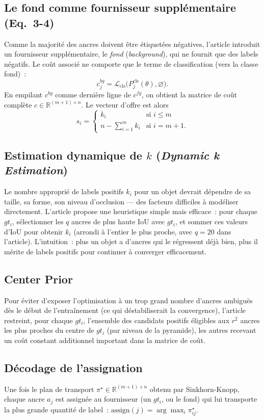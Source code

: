 \documentclass[11pt,a4paper]{article}
\begin{document}
\subsection{Le fond comme fournisseur supplémentaire (Eq.~3-4)}
Comme la majorité des ancres doivent être étiquetées négatives, l'article introduit un fournisseur supplémentaire, le \emph{fond} (\emph{background}), qui ne fournit que des labels négatifs. Le coût associé ne comporte que le terme de classification (vers la classe \og fond\fg)~:
\[
  c^{bg}_j = \mathcal{L}_{\text{cls}}\big(P^{\text{cls}}_j(\theta), \varnothing\big).
\]
En empilant $c^{bg}$ comme dernière ligne de $c^{fg}$, on obtient la matrice de coût complète $c \in \mathbb{R}^{(m+1)\times n}$. Le vecteur d'offre est alors
\[
  s_i = \begin{cases} k_i & \text{si } i \le m \\ n - \sum_{i=1}^m k_i & \text{si } i=m+1. \end{cases}
\]

\subsection{Estimation dynamique de $k$ (\emph{Dynamic k Estimation})}
Le nombre approprié de labels positifs $k_i$ pour un objet devrait dépendre de sa taille, sa forme, son niveau d'occlusion --- des facteurs difficiles à modéliser directement. L'article propose une heuristique simple mais efficace~: pour chaque $gt_i$, sélectionner les $q$ ancres de plus haute IoU avec $gt_i$, et sommer ces valeurs d'IoU pour obtenir $k_i$ (arrondi à l'entier le plus proche, avec $q=20$ dans l'article). L'intuition~: plus un objet a d'ancres qui le régressent déjà bien, plus il \og mérite\fg{} de labels positifs pour continuer à converger efficacement.

\subsection{Center Prior}
Pour éviter d'exposer l'optimisation à un trop grand nombre d'ancres ambiguës dès le début de l'entraînement (ce qui déstabiliserait la convergence), l'article restreint, pour chaque $gt_i$, l'ensemble des candidats positifs éligibles aux $r^2$ ancres les plus proches du centre de $gt_i$ (par niveau de la pyramide), les autres recevant un coût constant additionnel important dans la matrice de coût.

\subsection{Décodage de l'assignation}
Une fois le plan de transport $\pi^\star \in \mathbb{R}^{(m+1)\times n}$ obtenu par Sinkhorn-Knopp, chaque ancre $a_j$ est assignée au fournisseur (un $gt_i$, ou le fond) qui lui transporte la plus grande quantité de label~: $\mathrm{assign}(j) = \arg\max_i \pi^\star_{ij}$.
\end{document}
